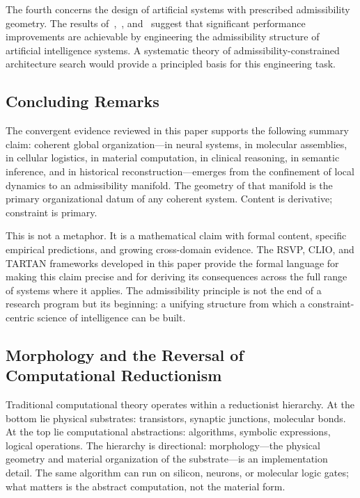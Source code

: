 \documentclass[11pt, oneside]{article}
\numberwithin{equation}{section}
\theoremstyle{rsvpstyle}
\theoremstyle{remark}
\begin{document}
The fourth concerns the design of artificial systems with prescribed admissibility
geometry. The results of~\cite{Li2026Stretchable},~\cite{Wu2026GNN}, and~\cite{Matas2026BCC}
suggest that significant performance improvements are achievable by engineering the
admissibility structure of artificial intelligence systems. A systematic theory of
admissibility-constrained architecture search would provide a principled basis for
this engineering task.

\subsection{Concluding Remarks}

The convergent evidence reviewed in this paper supports the following summary claim:
coherent global organization---in neural systems, in molecular assemblies, in cellular
logistics, in material computation, in clinical reasoning, in semantic inference, and
in historical reconstruction---emerges from the confinement of local dynamics to an
admissibility manifold. The geometry of that manifold is the primary organizational
datum of any coherent system. Content is derivative; constraint is primary.

This is not a metaphor. It is a mathematical claim with formal content, specific
empirical predictions, and growing cross-domain evidence. The RSVP, CLIO, and TARTAN
frameworks developed in this paper provide the formal language for making this claim
precise and for deriving its consequences across the full range of systems where it
applies. The admissibility principle is not the end of a research program but its
beginning: a unifying structure from which a constraint-centric science of intelligence
can be built.

\subsection{Morphology and the Reversal of Computational Reductionism}

Traditional computational theory operates within a reductionist hierarchy. At the
bottom lie physical substrates: transistors, synaptic junctions, molecular bonds.
At the top lie computational abstractions: algorithms, symbolic expressions, logical
operations. The hierarchy is directional: morphology---the physical geometry and
material organization of the substrate---is an implementation detail. The same
algorithm can run on silicon, neurons, or molecular logic gates; what matters is the
abstract computation, not the material form.
\end{document}
